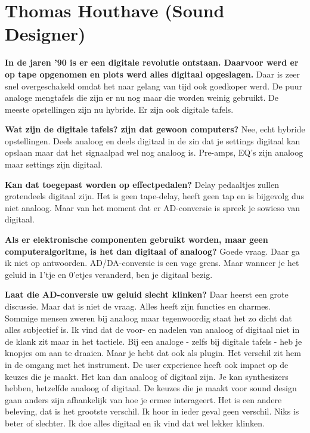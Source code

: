 \section{Thomas Houthave (Sound Designer)}
\label{trans:thomashouthave}

\textbf{In de jaren '90 is er een digitale revolutie ontstaan. Daarvoor werd er op tape opgenomen en plots werd alles digitaal opgeslagen.}\newline
Daar is zeer snel overgeschakeld omdat het naar gelang van tijd ook goedkoper werd. De puur analoge mengtafels die zijn er nu nog maar die worden weinig gebruikt.
De meeste opstellingen zijn nu hybride. Er zijn ook digitale tafels.

\textbf{Wat zijn de digitale tafels? zijn dat gewoon computers?}\newline
Nee, echt hybride opstellingen. Deels analoog en deels digitaal in de zin dat je settings digitaal kan opslaan maar dat het signaalpad wel nog analoog is.
Pre-amps, EQ's zijn analoog maar settings zijn digitaal.

\textbf{Kan dat toegepast worden op effectpedalen?}\newline
Delay pedaaltjes zullen grotendeels digitaal zijn. Het is geen tape-delay, heeft geen tap en is bijgevolg dus niet analoog. Maar van het moment dat er AD-conversie is spreek je sowieso van digitaal.

\textbf{Als er elektronische componenten gebruikt worden, maar geen computeralgoritme, is het dan digitaal of analoog?}\newline
Goede vraag. Daar ga ik niet op antwoorden. AD/DA-conversie is een vage grens. Maar wanneer je het geluid in 1'tje en 0'etjes veranderd, ben je digitaal bezig.

\textbf{Laat die AD-conversie uw geluid slecht klinken?}\newline
Daar heerst een grote discussie. Maar dat is niet de vraag. Alles heeft zijn functies en charmes. Sommige mensen zweren bij analoog maar tegenwoordig staat het zo dicht dat alles subjectief is.
Ik vind dat de voor- en nadelen van analoog of digitaal niet in de klank zit maar in het tactiele. Bij een analoge - zelfs bij digitale tafels - heb je knopjes om aan te draaien.
Maar je hebt dat ook als plugin. Het verschil zit hem in de omgang met het instrument. De user experience heeft ook impact op de keuzes die je maakt.
Het kan dan analoog of digitaal zijn. Je kan synthesizers hebben, hetzelfde analoog of digitaal. De keuzes die je maakt voor sound design gaan anders zijn afhankelijk van hoe je ermee interageert.
Het is een andere beleving, dat is het grootste verschil. Ik hoor in ieder geval geen verschil. Niks is beter of slechter. Ik doe alles digitaal en ik vind dat wel lekker klinken.

